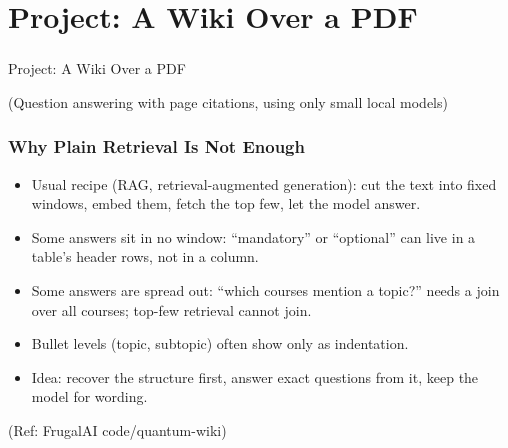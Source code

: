 
\section[PDF Wiki]{Project: A Wiki Over a PDF}

\begin{frame}[fragile]\frametitle{}
\begin{center}
{\Large Project: A Wiki Over a PDF}

\medskip
{\small (Question answering with page citations, using only small local models)}
\end{center}
\end{frame}

\begin{frame}[fragile]\frametitle{Why Plain Retrieval Is Not Enough}
\begin{itemize}
\item Usual recipe (RAG, retrieval-augmented generation): cut the text into fixed windows, embed them, fetch the top few, let the model answer.
\item Some answers sit in no window: ``mandatory'' or ``optional'' can live in a table's header rows, not in a column.
\item Some answers are spread out: ``which courses mention a topic?'' needs a join over all courses; top-few retrieval cannot join.
\item Bullet levels (topic, subtopic) often show only as indentation.
\item Idea: recover the structure first, answer exact questions from it, keep the model for wording.
\end{itemize}
{\tiny (Ref: FrugalAI code/quantum-wiki)}
\end{frame}

